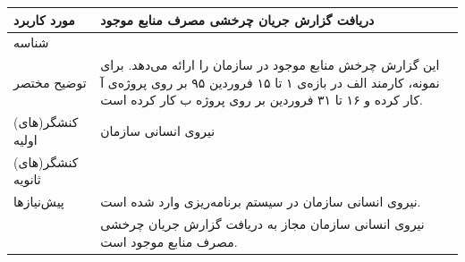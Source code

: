 \begin{table}[H]
	\centering
	\begin{tabular}{|p{3cm}|p{10cm}|}
		\hline
		
		
		مورد کاربرد & دریافت گزارش جریان چرخشی مصرف منابع موجود  \\
		\hline
		
		شناسه & 
		\stepcounter{usecase_ID}
		
		\arabic{usecase_ID} \\
		
		\hline
		
		توضیح مختصر & این گزارش چرخش منابع موجود در سازمان را ارائه می‌دهد. برای نمونه، کارمند الف در بازه‌ی ۱ تا ۱۵ فروردین ۹۵ بر روی پروژه‌ی آ کار کرده و ۱۶ تا ۳۱ فروردین بر روی پروژه ب کار کرده است. \\
		\hline
		
		
		کنشگر(های) اولیه& نیروی انسانی سازمان \\
		\hline
		
		کنشگر(های) ثانویه&  \\
		\hline
		
		پیش‌نیازها
		& نیروی انسانی سازمان در سیستم برنامه‌ریزی وارد شده است.\\
		& نیروی انسانی سازمان مجاز به دریافت گزارش جریان چرخشی مصرف منابع موجود است. \\
		\hline
		

\end{tabular}
\end{table}
